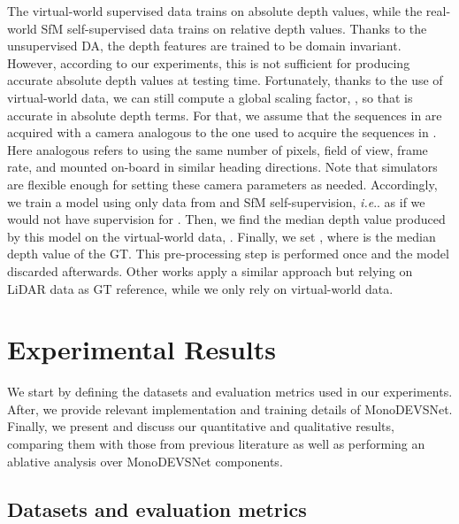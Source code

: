 \documentclass[journal]{IEEEtran}
\makeatletter
\DeclareRobustCommand\onedot{\futurelet\@let@token\@onedot}
\def\@onedot{\ifx\@let@token.\else.\null\fi\xspace}
\def\ie{\emph{i.e}\onedot} \def\Ie{\emph{I.e}\onedot}
\makeatother
\begin{document}
The virtual-world supervised data trains  on absolute depth values, while the real-world SfM self-supervised data trains  on relative depth values. Thanks to the unsupervised DA, the depth features  are trained to be domain invariant. However, according to our experiments, this is not sufficient for  producing accurate absolute depth values at testing time. Fortunately, thanks to the use of virtual-world data, we can still compute a global scaling factor, , so that  is accurate in absolute depth terms. For that, we assume that the sequences in  are acquired with a camera analogous to the one used to acquire the sequences in . Here analogous refers to using the same number of pixels, field of view, frame rate, and mounted on-board in similar heading directions. Note that simulators are flexible enough for setting these camera parameters as needed. Accordingly, we train a  model using only data from  and SfM self-supervision, {\ie} as if we would not have supervision for . Then, we find the median depth value produced by this model on the virtual-world data, . Finally, we set , where  is the median depth value of the GT. This pre-processing step is performed once and the model discarded afterwards. Other works apply a similar approach \cite{Zhou:2017, Godard:2019MonoDepth2, Cheng:2020S3Net, Guizilini:2020semantic, Zhao:2020} but relying on LiDAR data as GT reference, while we only rely on virtual-world data.

\section{Experimental Results}
\label{sec:experiments}
We start by defining the datasets and evaluation metrics used in our experiments. After, we provide relevant implementation and training details of MonoDEVSNet. Finally, we present and discuss our quantitative and qualitative results, comparing them with those from previous literature as well as performing an ablative analysis over MonoDEVSNet components.

\subsection{Datasets and evaluation metrics}
\label{ssec:datasets}
\end{document}
